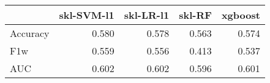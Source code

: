 \begin{tabular}{lrrrr}
\toprule
{} &  skl-SVM-l1 &  skl-LR-l1 &  skl-RF &  xgboost \\
\midrule
Accuracy &       0.580 &      0.578 &   0.563 &    0.574 \\
F1w      &       0.559 &      0.556 &   0.413 &    0.537 \\
AUC      &       0.602 &      0.602 &   0.596 &    0.601 \\
\bottomrule
\end{tabular}
